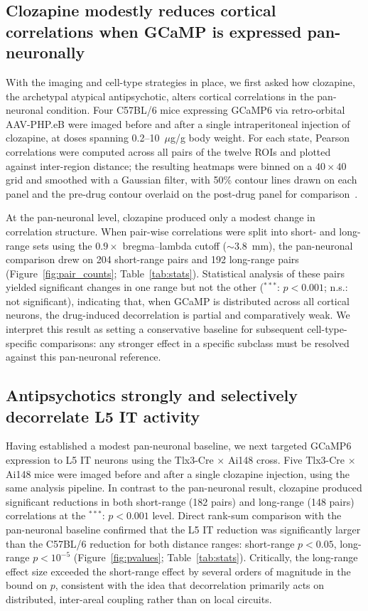 \documentclass[11pt]{article}
\begin{document}
\subsection{Clozapine modestly reduces cortical correlations when GCaMP is expressed pan-neuronally}

With the imaging and cell-type strategies in place, we first asked how clozapine, the archetypal atypical antipsychotic, alters cortical correlations in the pan-neuronal condition. Four C57BL/6 mice expressing GCaMP6 via retro-orbital AAV-PHP.eB were imaged before and after a single intraperitoneal injection of clozapine, at doses spanning 0.2--10~$\mu$g/g body weight. For each state, Pearson correlations were computed across all pairs of the twelve ROIs and plotted against inter-region distance; the resulting heatmaps were binned on a $40\times40$ grid and smoothed with a Gaussian filter, with 50\% contour lines drawn on each panel and the pre-drug contour overlaid on the post-drug panel for comparison~\citep{dombeck2007imaging, saravanan2020hierarchical}.

At the pan-neuronal level, clozapine produced only a modest change in correlation structure. When pair-wise correlations were split into short- and long-range sets using the $0.9\times$ bregma--lambda cutoff ($\sim$3.8~mm), the pan-neuronal comparison drew on 204 short-range pairs and 192 long-range pairs (Figure~\ref{fig:pair_counts}; Table~\ref{tab:stats}). Statistical analysis of these pairs yielded significant changes in one range but not the other ($^{***}$: $p<0.001$; n.s.: not significant), indicating that, when GCaMP is distributed across all cortical neurons, the drug-induced decorrelation is partial and comparatively weak. We interpret this result as setting a conservative baseline for subsequent cell-type-specific comparisons: any stronger effect in a specific subclass must be resolved against this pan-neuronal reference.

\subsection{Antipsychotics strongly and selectively decorrelate L5 IT activity}

Having established a modest pan-neuronal baseline, we next targeted GCaMP6 expression to L5 IT neurons using the Tlx3-Cre $\times$ Ai148 cross. Five Tlx3-Cre $\times$ Ai148 mice were imaged before and after a single clozapine injection, using the same analysis pipeline. In contrast to the pan-neuronal result, clozapine produced significant reductions in both short-range (182 pairs) and long-range (148 pairs) correlations at the $^{***}$: $p<0.001$ level. Direct rank-sum comparison with the pan-neuronal baseline confirmed that the L5 IT reduction was significantly larger than the C57BL/6 reduction for both distance ranges: short-range $p<0.05$, long-range $p<10^{-5}$ (Figure~\ref{fig:pvalues}; Table~\ref{tab:stats}). Critically, the long-range effect size exceeded the short-range effect by several orders of magnitude in the bound on $p$, consistent with the idea that decorrelation primarily acts on distributed, inter-areal coupling rather than on local circuits.
\end{document}
